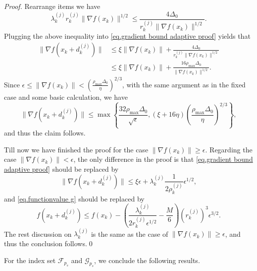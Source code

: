 \begin{proof}
        Rearrange items we have
        \begin{equation*}
            \lambda_k^{(j)}r_k^{(j)}\|\nabla f(x_k)\|^{1/2} \leq \frac{4\Delta_0}{r_k^{(j)}\|\nabla f(x_k)\|^{1/2}}.
        \end{equation*}
        Plugging the above inequality into \eqref{eq.gradient bound adaptive proof} yields that
        \begin{equation*}
        \begin{aligned}
            \| \nabla f(x_k+d_k^{(j)})\| &\leq \xi \|\nabla f(x_k)\| + \frac{4\Delta_0}{r_k^{(j)}\|\nabla f(x_k)\|^{1/2}}\\
            &\leq \xi \|\nabla f(x_k)\| + \frac{16\rho_{\max}\Delta_0}{\|\nabla f(x_k)\|^{1/2}}.
        \end{aligned}
        \end{equation*}
        Since $\epsilon\leq \|\nabla f(x_k)\|<\left (\frac{\rho_{\max}\Delta_0}{\eta}\right)^{2/3}$, with the same argument as in the fixed case and some basic calculation, we have
        \begin{equation*}
            \|\nabla f(x_k+d_k^{(j)})\| \leq \max \left \{ \frac{32\rho_{\max}\Delta_0}{\sqrt{\epsilon}},(\xi+16\eta)\left (\frac{\rho_{\max}\Delta_0}{\eta}\right)^{2/3}\right \},
        \end{equation*}
        and thus the claim follows.
        
        Till now we have finished the proof for the case $\|\nabla f(x_k)\| \geq \epsilon$. Regarding the case $\|\nabla f(x_k)\|< \epsilon$, the only difference in the proof is that \eqref{eq.gradient bound adaptive proof} should be replaced by 
        \begin{equation*}
            \| \nabla f(x_k+d_k^{(j)})\| \leq \xi \epsilon + \lambda_k^{(j)} \frac{1}{2\rho_k^{(j)}} \epsilon^{1/2},
        \end{equation*}
        and \eqref{eq.functionvalue g} should be replaced by 
        \begin{equation*}
            f(x_k+d_k^{(j)})\leq f(x_k)-\left(\frac{\lambda_k^{(j)}}{2r_k^{(j)}\epsilon^{1/2}}-\frac{M}{6}\right)(r_k^{(j)})^3 \epsilon^{3/2}.
        \end{equation*}
        The rest discussion on $\lambda_k^{(j)}$ is the same as the case of $\|\nabla f(x_k)\| \ge \epsilon$, and thus the conclusion follows.\smartqed \qed
\end{proof}
For the index set $\mathcal{F}_{p_s}$ and $\mathcal{G}_{p_s}$, we conclude the following results.
